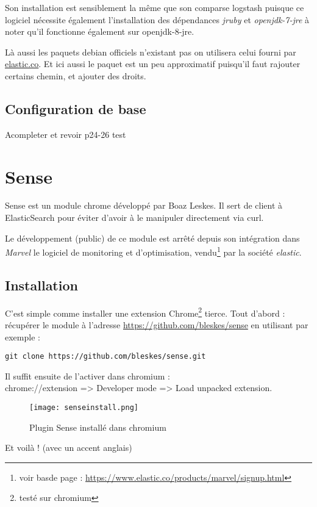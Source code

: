 Son installation est sensiblement la même que son comparse logstash puisque ce logiciel 
nécessite également l'installation des dépendances \emph{jruby} et \emph{openjdk-7-jre}
à noter qu'il fonctionne également sur openjdk-8-jre.

Là aussi les paquets debian officiels n'existant pas on utilisera celui fourni par 
\hyperref[https://download.elastic.co/elasticsearch/elasticsearch/elasticsearch-1.5.1.deb]{elastic.co}.
Et ici aussi le paquet est un peu approximatif puisqu'il faut rajouter certains 
chemin, et ajouter des droits.

\subsection{Configuration de base}


{\huge Acompleter et revoir}
p24-26
 test


\section{Sense}
Sense est un module chrome développé par Boaz Leskes. Il sert de client à ElasticSearch
pour éviter d'avoir à le manipuler directement via curl.

Le développement (public) de ce module est arrêté depuis son intégration dans \emph{Marvel} 
le logiciel de monitoring et d'optimisation, vendu\footnote{voir basde page : 
\url{https://www.elastic.co/products/marvel/signup.html}} par la société \emph{elastic}.


\subsection{Installation}
C'est simple comme installer une extension Chrome\footnote{testé sur chromium} tierce.
Tout d'abord : récupérer le module à l'adresse \url{https://github.com/bleskes/sense}
en utilisant par exemple : 
\begin{lstlisting}[style=code,label=lst:gitclonesense]
git clone https://github.com/bleskes/sense.git
\end{lstlisting}

Il suffit ensuite de l'activer dans chromium :\\ 
chrome://extension => Developer mode => Load unpacked extension.
\begin{figure}[H]
\center
\texttt{[image: senseinstall.png]}
\label{fig:senseinstall}
\caption{Plugin Sense installé dans chromium}
\end{figure}
Et voilà ! \footnotesize{(avec un accent anglais)}
